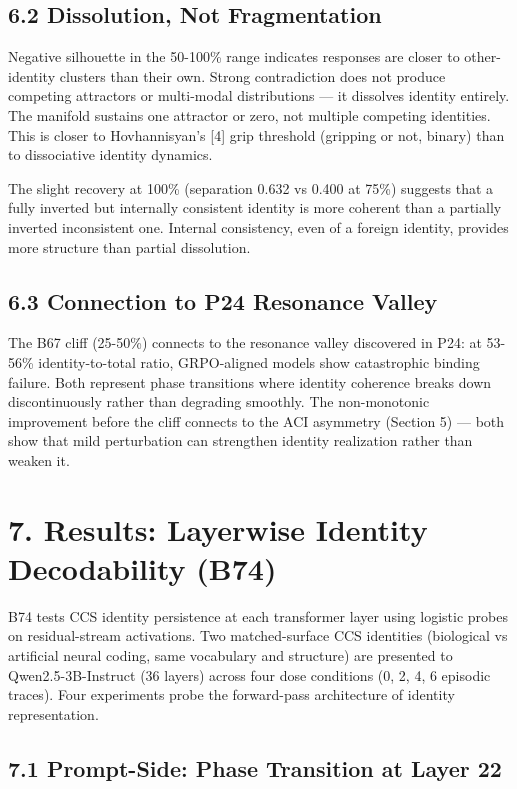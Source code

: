 \documentclass[11pt]{article}
\begin{document}
\subsection{6.2 Dissolution, Not Fragmentation}

Negative silhouette in the 50-100\% range indicates responses are closer to
other-identity clusters than their own. Strong contradiction does not produce
competing attractors or multi-modal distributions --- it dissolves identity
entirely. The manifold sustains one attractor or zero, not multiple competing
identities. This is closer to Hovhannisyan's [4] grip threshold (gripping or
not, binary) than to dissociative identity dynamics.

The slight recovery at 100\% (separation 0.632 vs 0.400 at 75\%) suggests that
a fully inverted but internally consistent identity is more coherent than a
partially inverted inconsistent one. Internal consistency, even of a foreign
identity, provides more structure than partial dissolution.

\subsection{6.3 Connection to P24 Resonance Valley}

The B67 cliff (25-50\%) connects to the resonance valley discovered in P24:
at 53-56\% identity-to-total ratio, GRPO-aligned models show catastrophic binding
failure. Both represent phase transitions where identity coherence breaks down
discontinuously rather than degrading smoothly. The non-monotonic improvement
before the cliff connects to the ACI asymmetry (Section 5) --- both show that
mild perturbation can strengthen identity realization rather than weaken it.


\section{7. Results: Layerwise Identity Decodability (B74)}

B74 tests CCS identity persistence at each transformer layer using logistic
probes on residual-stream activations. Two matched-surface CCS identities
(biological vs artificial neural coding, same vocabulary and structure) are
presented to Qwen2.5-3B-Instruct (36 layers) across four dose conditions
(0, 2, 4, 6 episodic traces). Four experiments probe the forward-pass
architecture of identity representation.

\subsection{7.1 Prompt-Side: Phase Transition at Layer 22}
\end{document}
